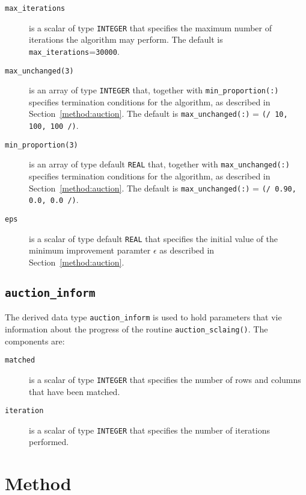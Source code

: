 \begin{description}

\item[\texttt{max\_iterations}] is a scalar of type \texttt{INTEGER} that specifies the maximum number of iterations the algorithm may perform. The default is \texttt{max\_iterations}=\texttt{30000}.

\item[\texttt{max\_unchanged(3)}] is an array of type \texttt{INTEGER} that, together with \texttt{min\_proportion(:)} specifies termination conditions for the algorithm, as described in Section~\ref{method:auction}. The default is \texttt{max\_unchanged(:)} = \texttt{(/ 10, 100, 100 /)}.

\item[\texttt{min\_proportion(3)}] is an array of type default \texttt{REAL} that, together with \texttt{max\_unchanged(:)} specifies termination conditions for the algorithm, as described in Section~\ref{method:auction}. The default is \texttt{max\_unchanged(:)} = \texttt{(/ 0.90, 0.0, 0.0 /)}.

\item[\texttt{eps}] is a scalar of type default \texttt{REAL} that specifies the initial value of the minimum improvement paramter $\epsilon$ as described in Section~\ref{method:auction}.

\end{description}

\subsection{\texttt{auction\_inform}} \label{type:auction_inform}

The derived data type \texttt{auction\_inform} is used to hold parameters that vie information about the progress of the routine \texttt{auction\_sclaing()}. The components are:

\begin{description}

\item[\texttt{matched}] is a scalar of type \texttt{INTEGER} that specifies the number of rows and columns that have been matched.

\item[\texttt{iteration}] is a scalar of type \texttt{INTEGER} that specifies the number of iterations performed.

\end{description}

\section{Method} \label{method}

